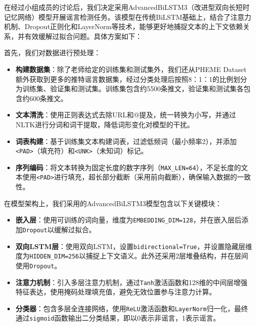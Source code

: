 在经过小组成员的讨论后，我们决定采用AdvancedBiLSTM3（改进型双向长短时记忆网络）模型开展谣言检测任务。该模型在传统BiLSTM基础上，结合了注意力机制、Dropout正则化和LayerNorm等技术，能够更好地捕捉文本的上下文依赖关系，并有效缓解过拟合问题。具体方案如下：

\vspace{1em}
首先，我们对数据进行预处理：
\begin{itemize}
    \item \textbf{构建数据集}：除了老师给定的训练集和测试集外，我们还从PHEME Dataset额外获取到更多的推特谣言数据集，经过分类处理后按照8：1：1的比例划分为训练集、验证集和测试集。训练集包含约5500条推文，验证集和测试集各包含约600条推文。
    \item \textbf{文本清洗}：使用正则表达式去除URL和@提及，统一转换为小写，并通过NLTK进行分词和词干提取，降低词形变化对模型的干扰。
    \item \textbf{词表构建}：基于训练集文本构建词表，过滤低频词（最小频率2），并添加\verb|<PAD>|（填充符）和\verb|<UNK>|（未知词）标记。
    \item \textbf{序列编码}：将文本转换为固定长度的数字序列（\verb|MAX_LEN=64|），不足长度的文本使用\verb|<PAD>|进行填充，超长部分截断（采用前向截断），确保输入数据的一致性。
\end{itemize}

\vspace{1em}
在模型架构上，我们采用的AdvancedBiLSTM3模型包含以下关键模块：
\begin{itemize}
    \item \textbf{嵌入层}：使用可训练的词向量，维度为\verb|EMBEDDING_DIM=128|，并在嵌入层后添加\verb|Dropout|以缓解过拟合。
    \item \textbf{双向LSTM层}：使用双向LSTM，设置\verb|bidirectional=True|，并设置隐藏层维度为\verb|HIDDEN_DIM=256|以捕捉上下文语义。此外还采用2层堆叠结构，并在层间使用\verb|Dropout|。
    \item \textbf{注意力机制}：引入多层注意力机制，通过\verb|Tanh|激活函数和128维的中间层增强特征表达，使用掩码处理填充值，避免无效位置参与注意力计算。
    \item \textbf{分类器}：包含多层全连接网络，使用\verb|ReLU|激活函数和\verb|LayerNorm|归一化，最终通过\verb|sigmoid|函数输出二分类结果，即以0表示非谣言，1表示谣言。
\end{itemize}

